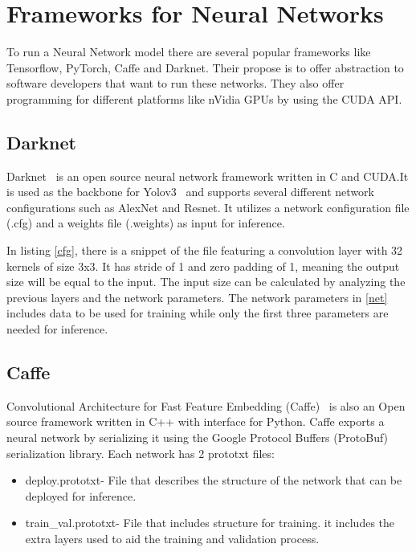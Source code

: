 
 \section{Frameworks for Neural Networks}
 \label{section:darknet}

\quad To run a Neural Network model there are several popular frameworks like Tensorflow, PyTorch, Caffe and Darknet.
Their propose is to offer abstraction to software developers that want to run these networks. They also offer
programming for different platforms like nVidia GPUs by using the CUDA API.


\subsection{Darknet}

\quad Darknet~\cite{darknet} is an open source neural network framework written in C and CUDA.It is used as the backbone for Yolov3~\cite{yolov3} and supports several different network configurations such as AlexNet and Resnet.
 It utilizes a network configuration
file (.cfg) and a weights file (.weights) as input for inference.



In listing \ref{cfg}, there is a snippet of the file featuring
a convolution layer with 32 kernels of size 3x3. It has stride of 1 and zero padding of 1, meaning the output size will
be equal to the input. The input size can be calculated by analyzing the previous layers and the network parameters. The network parameters in \ref{net} includes
data to be used for training while only the first three parameters are needed for inference.




\subsection{Caffe}


\quad Convolutional Architecture for Fast Feature Embedding (Caffe)~\cite{caffe} is also an Open source framework written in C++ with interface for Python.
Caffe exports a neural network by serializing it using the Google Protocol Buffers (ProtoBuf) serialization library. Each network has 2 prototxt files:
\begin{itemize}
    \item  deploy.prototxt- File that describes the structure of the network that can be deployed for inference.
    \item  train\_val.prototxt- File that includes structure for training. 
    it includes the extra layers used to aid the training and validation process.
\end{itemize}


